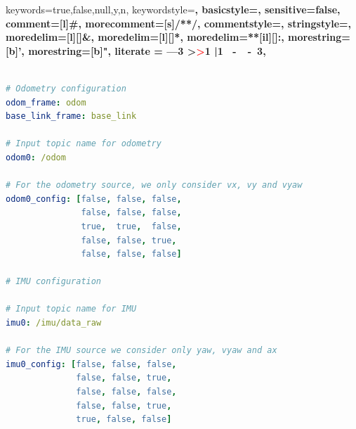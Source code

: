 \expandafter\expandafter\expandafter\lstdefinelanguage
\expandafter{\language@yaml}
{
keywords={true,false,null,y,n},
keywordstyle=\color{darkgray}\bfseries,
basicstyle=\YAMLkeystyle,                                 %
sensitive=false,
comment=[l]{\#},
morecomment=[s]{/*}{*/},
commentstyle=\color{mygreen}\ttfamily,
stringstyle=\YAMLvaluestyle\ttfamily,
moredelim=[l][\color{orange}]{\&},
moredelim=[l][\color{magenta}]{*},
moredelim=**[il][\YAMLcolonstyle{:}\YAMLvaluestyle]{:},   %
morestring=[b]',
morestring=[b]",
literate =    {---}{{\ProcessThreeDashes}}3
{>}{{\textcolor{red}\textgreater}}1
{|}{{\textcolor{red}\textbar}}1
{\ -\ }{{\mdseries\ -\ }}3,
}

\makeatother

\newcommand\ProcessThreeDashes{\llap{\color{cyan}\mdseries-{-}-}}

\begin{lstlisting}[language=yaml, label=cod:rosLocalization, caption=Configuraciones del filtro proveído por el paquete ros\_localization .\protect\footnotemark]

# Odometry configuration
odom_frame: odom
base_link_frame: base_link

# Input topic name for odometry
odom0: /odom

# For the odometry source, we only consider vx, vy and vyaw
odom0_config: [false, false, false,
               false, false, false,
               true,  true,  false,
               false, false, true,
               false, false, false]

# IMU configuration

# Input topic name for IMU
imu0: /imu/data_raw

# For the IMU source we consider only yaw, vyaw and ax
imu0_config: [false, false, false,
              false, false, true,
              false, false, false,
              false, false, true,
              true, false, false]

\end{lstlisting}



